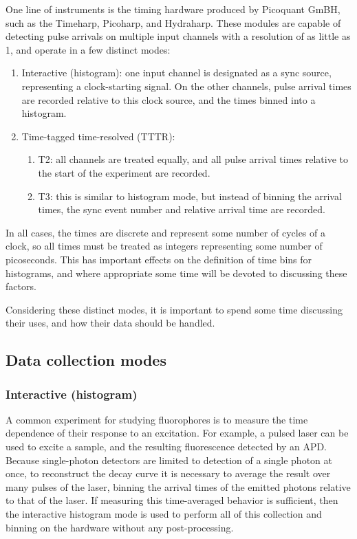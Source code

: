 \documentclass{article}
\numberwithin{equation}{section}
\numberwithin{figure}{section}
\begin{document}
One line of instruments is the timing hardware produced by Picoquant GmBH, such as the Timeharp, Picoharp, and Hydraharp. These modules are capable of detecting pulse arrivals on multiple input channels with a resolution of as little as 1\pico\second, and operate in a few distinct modes:
\begin{enumerate}
\item Interactive (histogram): one input channel is designated as a sync source, representing a clock-starting signal. On the other channels, pulse arrival times are recorded relative to this clock source, and the times binned into a histogram. 
\item Time-tagged time-resolved (TTTR): 
	\begin{enumerate}
	\item T2: all channels are treated equally, and all pulse arrival times relative to the start of the experiment are recorded. 
	\item T3: this is similar to histogram mode, but instead of binning the arrival times, the sync event number and relative arrival time are recorded.
	\end{enumerate}
\end{enumerate}

In all cases, the times are discrete and represent some number of cycles of a clock, so all times must be treated as integers representing some number of picoseconds. This has important effects on the definition of time bins for histograms, and where appropriate some time will be devoted to discussing these factors. 

Considering these distinct modes, it is important to spend some time discussing their uses, and how their data should be handled.

\subsection{Data collection modes}
\label{sec:modes}
\subsubsection{Interactive (histogram)}
A common experiment for studying fluorophores is to measure the time dependence of their response to an excitation. For example, a pulsed laser can be used to excite a sample, and the resulting fluorescence detected by an APD. Because single-photon detectors are limited to detection of a single photon at once, to reconstruct the decay curve it is necessary to average the result over many pulses of the laser, binning the arrival times of the emitted photons relative to that of the laser. If measuring this time-averaged behavior is sufficient, then the interactive histogram mode is used to perform all of this collection and binning on the hardware without any post-processing. 
\end{document}
